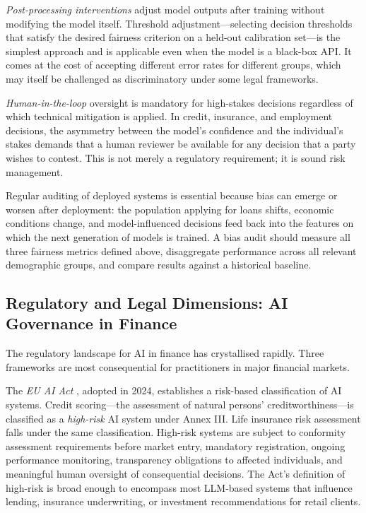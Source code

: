 \begin{context}
\emph{Post-processing interventions} adjust model outputs after training without modifying the model itself. Threshold adjustment---selecting decision thresholds that satisfy the desired fairness criterion on a held-out calibration set---is the simplest approach and is applicable even when the model is a black-box API. It comes at the cost of accepting different error rates for different groups, which may itself be challenged as discriminatory under some legal frameworks.

\emph{Human-in-the-loop} oversight is mandatory for high-stakes decisions regardless of which technical mitigation is applied. In credit, insurance, and employment decisions, the asymmetry between the model's confidence and the individual's stakes demands that a human reviewer be available for any decision that a party wishes to contest. This is not merely a regulatory requirement; it is sound risk management.

Regular auditing of deployed systems is essential because bias can emerge or worsen after deployment: the population applying for loans shifts, economic conditions change, and model-influenced decisions feed back into the features on which the next generation of models is trained. A bias audit should measure all three fairness metrics defined above, disaggregate performance across all relevant demographic groups, and compare results against a historical baseline.

\subsection{Regulatory and Legal Dimensions: AI Governance in Finance}
\label{subsec:af-ethics-regulatory}

The regulatory landscape for AI in finance has crystallised rapidly. Three frameworks are most consequential for practitioners in major financial markets.

The \emph{EU AI Act} \cite{euaiact2024}, adopted in 2024, establishes a risk-based classification of AI systems. Credit scoring---the assessment of natural persons' creditworthiness---is classified as a \emph{high-risk} AI system under Annex III. Life insurance risk assessment falls under the same classification. High-risk systems are subject to conformity assessment requirements before market entry, mandatory registration, ongoing performance monitoring, transparency obligations to affected individuals, and meaningful human oversight of consequential decisions. The Act's definition of high-risk is broad enough to encompass most LLM-based systems that influence lending, insurance underwriting, or investment recommendations for retail clients.


\end{context}

